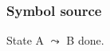 \documentclass{ltx-talk}
\begin{document}
\begin{frame}
\frametitle{Symbol source}
State A $\leadsto$ B done.
\end{frame}
\end{document}

